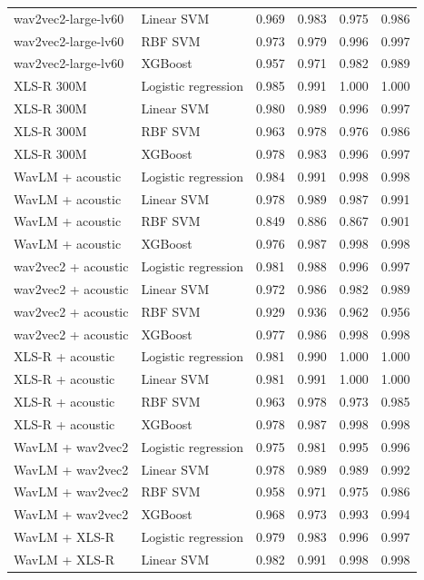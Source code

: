 \documentclass[10pt,a4paper]{article}
\begin{document}
\begin{center}
\begin{longtable}{p{3.6cm}p{2.4cm}rrrr}
wav2vec2-large-lv60 & Linear SVM & 0.969 & 0.983 & 0.975 & 0.986\\
wav2vec2-large-lv60 & RBF SVM & 0.973 & 0.979 & 0.996 & 0.997\\
wav2vec2-large-lv60 & XGBoost & 0.957 & 0.971 & 0.982 & 0.989\\
XLS-R 300M & Logistic regression & 0.985 & 0.991 & 1.000 & 1.000\\
XLS-R 300M & Linear SVM & 0.980 & 0.989 & 0.996 & 0.997\\
XLS-R 300M & RBF SVM & 0.963 & 0.978 & 0.976 & 0.986\\
XLS-R 300M & XGBoost & 0.978 & 0.983 & 0.996 & 0.997\\
WavLM + acoustic & Logistic regression & 0.984 & 0.991 & 0.998 & 0.998\\
WavLM + acoustic & Linear SVM & 0.978 & 0.989 & 0.987 & 0.991\\
WavLM + acoustic & RBF SVM & 0.849 & 0.886 & 0.867 & 0.901\\
WavLM + acoustic & XGBoost & 0.976 & 0.987 & 0.998 & 0.998\\
wav2vec2 + acoustic & Logistic regression & 0.981 & 0.988 & 0.996 & 0.997\\
wav2vec2 + acoustic & Linear SVM & 0.972 & 0.986 & 0.982 & 0.989\\
wav2vec2 + acoustic & RBF SVM & 0.929 & 0.936 & 0.962 & 0.956\\
wav2vec2 + acoustic & XGBoost & 0.977 & 0.986 & 0.998 & 0.998\\
XLS-R + acoustic & Logistic regression & 0.981 & 0.990 & 1.000 & 1.000\\
XLS-R + acoustic & Linear SVM & 0.981 & 0.991 & 1.000 & 1.000\\
XLS-R + acoustic & RBF SVM & 0.963 & 0.978 & 0.973 & 0.985\\
XLS-R + acoustic & XGBoost & 0.978 & 0.987 & 0.998 & 0.998\\
WavLM + wav2vec2 & Logistic regression & 0.975 & 0.981 & 0.995 & 0.996\\
WavLM + wav2vec2 & Linear SVM & 0.978 & 0.989 & 0.989 & 0.992\\
WavLM + wav2vec2 & RBF SVM & 0.958 & 0.971 & 0.975 & 0.986\\
WavLM + wav2vec2 & XGBoost & 0.968 & 0.973 & 0.993 & 0.994\\
WavLM + XLS-R & Logistic regression & 0.979 & 0.983 & 0.996 & 0.997\\
WavLM + XLS-R & Linear SVM & 0.982 & 0.991 & 0.998 & 0.998\\

\end{longtable}
\end{center}
\end{document}
